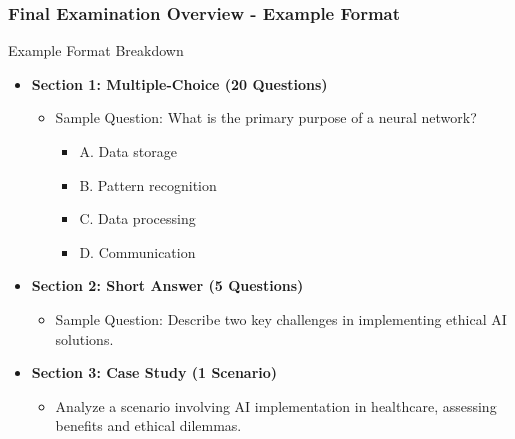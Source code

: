 \documentclass[aspectratio=169]{beamer}
\begin{document}
\begin{frame}[fragile]
    \frametitle{Final Examination Overview - Example Format}
    \begin{block}{Example Format Breakdown}
        \begin{itemize}
            \item \textbf{Section 1: Multiple-Choice (20 Questions)}
            \begin{itemize}
                \item Sample Question: What is the primary purpose of a neural network?
                \begin{itemize}
                    \item A. Data storage
                    \item B. Pattern recognition
                    \item C. Data processing
                    \item D. Communication
                \end{itemize}
            \end{itemize}
            \item \textbf{Section 2: Short Answer (5 Questions)}
            \begin{itemize}
                \item Sample Question: Describe two key challenges in implementing ethical AI solutions.
            \end{itemize}
            \item \textbf{Section 3: Case Study (1 Scenario)}
            \begin{itemize}
                \item Analyze a scenario involving AI implementation in healthcare, assessing benefits and ethical dilemmas.
            \end{itemize}
        \end{itemize}
    \end{block}
\end{frame}
\end{document}
